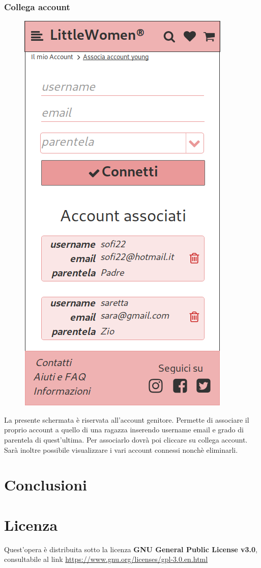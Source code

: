 \documentclass[12pt,a4paper]{report}
\begin{document}
\subsection{Collega account}
\begin{figure}
\centering
\includegraphics[height=0.4\textheight]{"Project Management Sources/Wireframe/WireFrame Screenshot/Mobile/Dettagli account"}
\end{figure}
La presente schermata è riservata all'account genitore. Permette di associare il proprio account a quello di una ragazza inserendo username email e grado di parentela di quest'ultima. Per associarlo dovrà poi cliccare su collega account. Sarà inoltre possibile visualizzare i vari account connessi nonchè eliminarli.
\chapter{Conclusioni}
\chapter{Licenza}
Quest'opera è distribuita sotto la licenza \textbf{GNU General Public License v3.0}, consultabile al link  \textcolor{blue}{\href{https://www.gnu.org/licenses/gpl-3.0.en.html}{https://www.gnu.org/licenses/gpl-3.0.en.html}}
\end{document}
